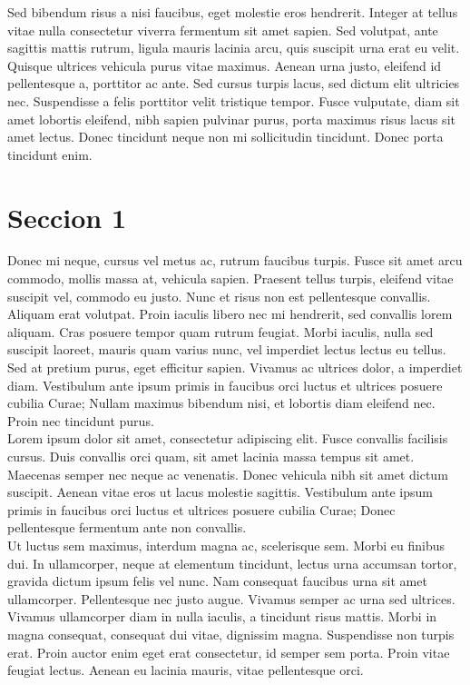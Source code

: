Sed bibendum risus a nisi faucibus, eget molestie eros hendrerit. Integer at tellus vitae nulla consectetur viverra fermentum sit amet sapien. Sed volutpat, ante sagittis mattis rutrum, ligula mauris lacinia arcu, quis suscipit urna erat eu velit. Quisque ultrices vehicula purus vitae maximus. Aenean urna justo, eleifend id pellentesque a, porttitor ac ante. Sed cursus turpis lacus, sed dictum elit ultricies nec. Suspendisse a felis porttitor velit tristique tempor. Fusce vulputate, diam sit amet lobortis eleifend, nibh sapien pulvinar purus, porta maximus risus lacus sit amet lectus. Donec tincidunt neque non mi sollicitudin tincidunt. Donec porta tincidunt enim.
\\

\section{Seccion 1}

Donec mi neque, cursus vel metus ac, rutrum faucibus turpis. Fusce sit amet arcu commodo, mollis massa at, vehicula sapien. Praesent tellus turpis, eleifend vitae suscipit vel, commodo eu justo. Nunc et risus non est pellentesque convallis. Aliquam erat volutpat. Proin iaculis libero nec mi hendrerit, sed convallis lorem aliquam. Cras posuere tempor quam rutrum feugiat. Morbi iaculis, nulla sed suscipit laoreet, mauris quam varius nunc, vel imperdiet lectus lectus eu tellus. Sed at pretium purus, eget efficitur sapien. Vivamus ac ultrices dolor, a imperdiet diam. Vestibulum ante ipsum primis in faucibus orci luctus et ultrices posuere cubilia Curae; Nullam maximus bibendum nisi, et lobortis diam eleifend nec. Proin nec tincidunt purus.
\\


Lorem ipsum dolor sit amet, consectetur adipiscing elit. Fusce convallis facilisis cursus. Duis convallis orci quam, sit amet lacinia massa tempus sit amet. Maecenas semper nec neque ac venenatis. Donec vehicula nibh sit amet dictum suscipit. Aenean vitae eros ut lacus molestie sagittis. Vestibulum ante ipsum primis in faucibus orci luctus et ultrices posuere cubilia Curae; Donec pellentesque fermentum ante non convallis.
\\

Ut luctus sem maximus, interdum magna ac, scelerisque sem. Morbi eu finibus dui. In ullamcorper, neque at elementum tincidunt, lectus urna accumsan tortor, gravida dictum ipsum felis vel nunc. Nam consequat faucibus urna sit amet ullamcorper. Pellentesque nec justo augue. Vivamus semper ac urna sed ultrices. Vivamus ullamcorper diam in nulla iaculis, a tincidunt risus mattis. Morbi in magna consequat, consequat dui vitae, dignissim magna. Suspendisse non turpis erat. Proin auctor enim eget erat consectetur, id semper sem porta. Proin vitae feugiat lectus. Aenean eu lacinia mauris, vitae pellentesque orci.
\\

